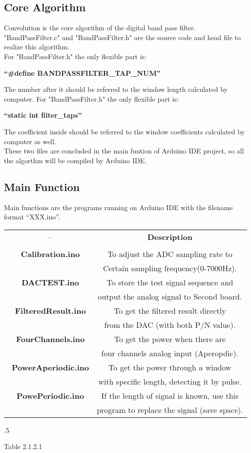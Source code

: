 \documentclass[12pt]{report}
\begin{document}
\subsection{Core Algorithm}
\textup{Convolution is the core algorithm of the digital band pass filter. "BandPassFilter.c" and "BandPassFilter.h" are the source code and head file to realize this algorithm.\\For "BandPassFilter.h" the only flexible part is:}
 \begin{flushleft}
\textbf{``\#define BANDPASSFILTER\_TAP\_NUM''}\\
 \end{flushleft}
\textup{The number after it should be referred to the window length calculated by computer.
For "BandPassFilter.h" the only flexible part is:}
 \begin{flushleft}
\textbf{``static int filter\_taps''}\\
 \end{flushleft}
\textup{The coefficient inside should be referred to the window coefficients calculated by computer as well.\\These two files are concluded in the main funtion of Arduino IDE project, so all the algorthm will be compiled by Arduino IDE.}
\newpage
\subsection{Main Function}
\textup{Main functions are the programs running on Arduino IDE with the filename format ``XXX.ino''.}
\begin{center}
    \begin{tabular}{||c|c||} \hline
      \ -- & \textbf{Description}\\ & \\ \hline
      \ \textbf{Calibration.ino} & To adjust the ADC sampling rate to \\ & Certain sampling frequency(0-7000Hz).\\ \hline
      \ \textbf{DACTEST.ino} & To store the test signal sequence and \\ & output the analog signal to Second board.\\ \hline
      \ \textbf{FilteredResult.ino} & To get the filtered result directly \\ & from the DAC (with both P/N value).\\ \hline
      \ \textbf{FourChannels.ino} & To get the power when there are \\ & four channels analog input (Aperopdic).\\ \hline
      \ \textbf{PowerAperiodic.ino} & To get the power through a window \\ & with specific length, detecting it by pulse.\\ \hline
      \ \textbf{PowePeriodic.ino} & If the length of signal is known, use this \\ & program to replace the signal (save space).\\ \hline
    \end{tabular}
  \end{center}
  \moveleft.5\hoffset\centerline{\footnotesize Table 2.1.2.1}
\end{document}

